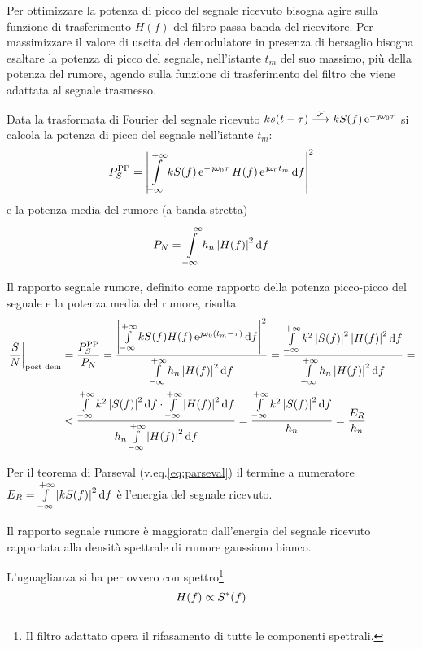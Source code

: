 Per ottimizzare la potenza di picco del segnale ricevuto bisogna agire sulla funzione di trasferimento $H(f)$ del filtro passa banda del ricevitore. Per massimizzare il valore di uscita del demodulatore in presenza di bersaglio bisogna esaltare la potenza di picco del segnale, nell'istante $t_m$ del suo massimo, più della potenza del rumore, agendo sulla funzione di trasferimento del filtro che viene adattata al segnale trasmesso. 

Data la trasformata di Fourier del segnale ricevuto $k s(t-\tau) \stackrel{\operatorname{\mathcal{F}}}{\longrightarrow} k S(f) \operatorname{e}^{-\jmath\omega_0\tau}$ si calcola la potenza di picco del segnale nell'istante $t_m$:
\begin{equation}
P_S^\text{PP}=\left|{\int\limits_{-\infty}^{+\infty}{k S(f)\operatorname{e}^{-\jmath\omega_0 \tau} H(f)\operatorname{e}^{\jmath\omega_0 t_m}}{\,\mathop{}\!\mathrm{d}{f}}}\right|^2
\end{equation}
e la potenza media del rumore (a banda stretta)
\begin{equation}
P_N=\int\limits_{-\infty}^{+\infty}{h_n\left|{H(f)}\right|^2}{\,\mathop{}\!\mathrm{d}{f}}
\end{equation}

Il rapporto segnale rumore, definito come rapporto della potenza picco-picco del segnale e la potenza media del rumore, risulta
\begin{equation}\begin{split}
\restrict{\frac{S}{N}}{\text{post dem}}&=\frac{P_S^\text{PP}}{P_N}=\frac{\abs{\intinf{k S(f) H(f)\e{\jmath\omega_0 (t_m-\tau)}}{f}}^2}{\intinf{h_n\abs{H(f)}^2}{f}}=
\frac{\intinf{k^2\abs{S(f)}^2\abs{H(f)}^2}{f}}{\intinf{h_n\abs{H(f)}^2}{f}}=\\
&<\frac{\intinf{k^2\abs{S(f)}^2}{f}\cdot\intinf{\abs{H(f)}^2}{f}}{h_n\intinf{\abs{H(f)}^2}{f}}=\frac{\intinf{k^2\abs{S(f)}^2}{f}}{h_n}=\frac{E_R}{h_n}
\end{split}\end{equation} 

Per il teorema di Parseval (v.eq.\ref{eq:parseval}) il termine a numeratore $E_R=\int\limits_{-\infty}^{+\infty}{\left|{k S(f)}\right|^2}{\,\mathop{}\!\mathrm{d}{f}}$ è l'energia del segnale ricevuto.

Il rapporto segnale rumore è maggiorato dall'energia del segnale ricevuto rapportata alla densità spettrale di rumore gaussiano bianco.

L'uguaglianza si ha per  ovvero con spettro\footnote{Il filtro adattato opera il rifasamento di tutte le componenti spettrali.} \begin{equation}H(f)\propto{S}^\ast(f)\label{eq:radar_filtro_adattato_rumore_bianco}\end{equation}


